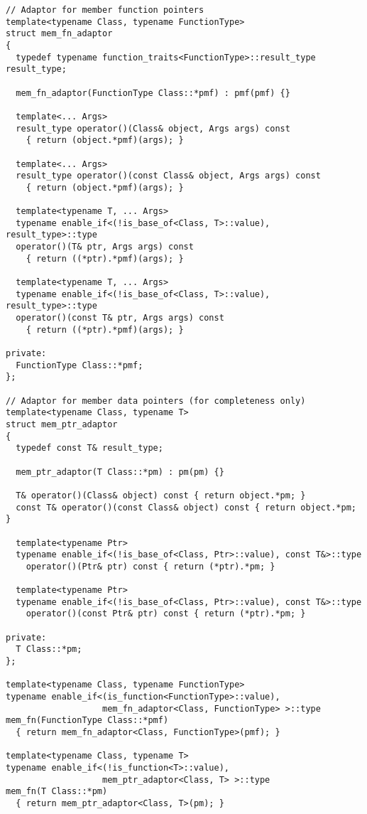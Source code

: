 \documentclass{article}
\begin{document}
\small
\begin{verbatim}
// Adaptor for member function pointers
template<typename Class, typename FunctionType>
struct mem_fn_adaptor
{
  typedef typename function_traits<FunctionType>::result_type result_type;

  mem_fn_adaptor(FunctionType Class::*pmf) : pmf(pmf) {}
  
  template<... Args>
  result_type operator()(Class& object, Args args) const
    { return (object.*pmf)(args); }

  template<... Args>
  result_type operator()(const Class& object, Args args) const
    { return (object.*pmf)(args); }

  template<typename T, ... Args>
  typename enable_if<(!is_base_of<Class, T>::value), result_type>::type
  operator()(T& ptr, Args args) const
    { return ((*ptr).*pmf)(args); }

  template<typename T, ... Args>
  typename enable_if<(!is_base_of<Class, T>::value), result_type>::type
  operator()(const T& ptr, Args args) const
    { return ((*ptr).*pmf)(args); }

private:
  FunctionType Class::*pmf;
};

// Adaptor for member data pointers (for completeness only)
template<typename Class, typename T>
struct mem_ptr_adaptor
{
  typedef const T& result_type;

  mem_ptr_adaptor(T Class::*pm) : pm(pm) {}

  T& operator()(Class& object) const { return object.*pm; }
  const T& operator()(const Class& object) const { return object.*pm; }

  template<typename Ptr> 
  typename enable_if<(!is_base_of<Class, Ptr>::value), const T&>::type
    operator()(Ptr& ptr) const { return (*ptr).*pm; }

  template<typename Ptr> 
  typename enable_if<(!is_base_of<Class, Ptr>::value), const T&>::type
    operator()(const Ptr& ptr) const { return (*ptr).*pm; }

private:
  T Class::*pm;
};

template<typename Class, typename FunctionType>
typename enable_if<(is_function<FunctionType>::value), 
                   mem_fn_adaptor<Class, FunctionType> >::type
mem_fn(FunctionType Class::*pmf)
  { return mem_fn_adaptor<Class, FunctionType>(pmf); }

template<typename Class, typename T>
typename enable_if<(!is_function<T>::value), 
                   mem_ptr_adaptor<Class, T> >::type
mem_fn(T Class::*pm)
  { return mem_ptr_adaptor<Class, T>(pm); }
\end{verbatim}
\normalsize 
\end{document}
